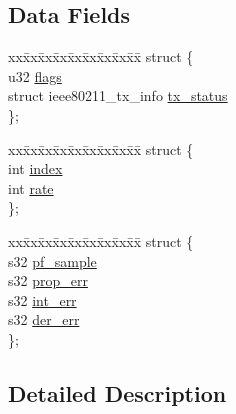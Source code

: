 \subsection*{Data Fields}
\begin{DoxyCompactItemize}
\item 
\begin{tabbing}
xx\=xx\=xx\=xx\=xx\=xx\=xx\=xx\=xx\=\kill
struct \{\\
\>u32 \hyperlink{unionrc__pid__event__data_a9fb2abd9f2594cefc48d6856e01f2879}{flags}\\
\>struct ieee80211\_tx\_info \hyperlink{unionrc__pid__event__data_ad0580b6e8aa75d244c97d299b7bac298}{tx\_status}\\
\}; \\

\end{tabbing}\item 
\begin{tabbing}
xx\=xx\=xx\=xx\=xx\=xx\=xx\=xx\=xx\=\kill
struct \{\\
\>int \hyperlink{unionrc__pid__event__data_a750b5d744c39a06bfb13e6eb010e35d0}{index}\\
\>int \hyperlink{unionrc__pid__event__data_a7a829e6fd74e94e0edf10550470d844c}{rate}\\
\}; \\

\end{tabbing}\item 
\begin{tabbing}
xx\=xx\=xx\=xx\=xx\=xx\=xx\=xx\=xx\=\kill
struct \{\\
\>s32 \hyperlink{unionrc__pid__event__data_ab03cef57c5c881d1d6510822f2933fdc}{pf\_sample}\\
\>s32 \hyperlink{unionrc__pid__event__data_a236877cfccb9799bf6c8d35aca9faa2c}{prop\_err}\\
\>s32 \hyperlink{unionrc__pid__event__data_afd0a2b97b5e445f22caaf127bf38148c}{int\_err}\\
\>s32 \hyperlink{unionrc__pid__event__data_a6e974dd77139e01c6060f753dc03b0f7}{der\_err}\\
\}; \\

\end{tabbing}\end{DoxyCompactItemize}


\subsection{Detailed Description}



